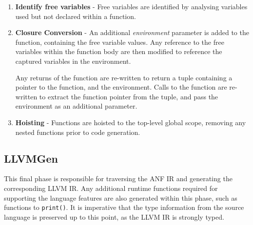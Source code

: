 \begin{enumerate}
      \item \textbf{Identify free variables} - Free variables are identified by
            analysing variables used but not declared within a function.

      \item \textbf{Closure Conversion} - An additional \emph{environment} parameter is added to the
            function, containing the free variable values. Any reference to the free variables
            within the function body are then modified to reference the captured variables in the
            environment.

            Any returns of the function are re-written to return a tuple containing a pointer to the
            function, and the environment. Calls to the function are re-written to extract the
            function pointer from the tuple, and pass the environment as an additional parameter.

      \item \textbf{Hoisting} - Functions are hoisted to the top-level global scope, removing any
            nested functions prior to code generation.
\end{enumerate}

\subsection{LLVMGen}

This final phase is responsible for traversing the ANF IR and generating the corresponding LLVM IR.
Any additional runtime functions required for supporting the language features are also generated
within this phase, such as functions to \texttt{print()}. It is imperative that the type information
from the source language is preserved up to this point, as the LLVM IR is strongly typed.
